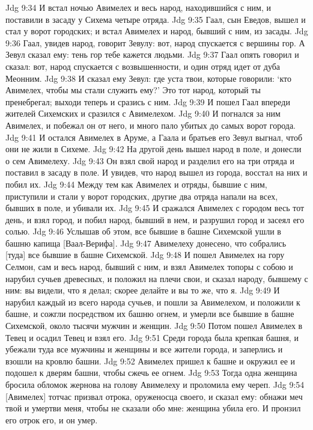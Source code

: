 Jdg 9:34  И встал ночью Авимелех и весь народ, находившийся с ним, и поставили в засаду у Сихема четыре отряда.
Jdg 9:35  Гаал, сын Еведов, вышел и стал у ворот городских; и встал Авимелех и народ, бывший с ним, из засады.
Jdg 9:36  Гаал, увидев народ, говорит Зевулу: вот, народ спускается с вершины гор. А Зевул сказал ему: тень гор тебе кажется людьми.
Jdg 9:37  Гаал опять говорил и сказал: вот, народ спускается с возвышенности, и один отряд идет от дуба Меонним.
Jdg 9:38  И сказал ему Зевул: где уста твои, которые говорили: `кто Авимелех, чтобы мы стали служить ему?' Это тот народ, который ты пренебрегал; выходи теперь и сразись с ним.
Jdg 9:39  И пошел Гаал впереди жителей Сихемских и сразился с Авимелехом.
Jdg 9:40  И погнался за ним Авимелех, и побежал он от него, и много пало убитых до самых ворот города.
Jdg 9:41  И остался Авимелех в Аруме, а Гаала и братьев его Зевул выгнал, чтоб они не жили в Сихеме.
Jdg 9:42  На другой день вышел народ в поле, и донесли о сем Авимелеху.
Jdg 9:43  Он взял свой народ и разделил его на три отряда и поставил в засаду в поле. И увидев, что народ вышел из города, восстал на них и побил их.
Jdg 9:44  Между тем как Авимелех и отряды, бывшие с ним, приступили и стали у ворот городских, другие два отряда напали на всех, бывших в поле, и убивали их.
Jdg 9:45  И сражался Авимелех с городом весь тот день, и взял город, и побил народ, бывший в нем, и разрушил город и засеял его солью.
Jdg 9:46  Услышав об этом, все бывшие в башне Сихемской ушли в башню капища [Ваал-Верифа].
Jdg 9:47  Авимелеху донесено, что собрались [туда] все бывшие в башне Сихемской.
Jdg 9:48  И пошел Авимелех на гору Селмон, сам и весь народ, бывший с ним, и взял Авимелех топоры с собою и нарубил сучьев древесных, и положил на плечи свои, и сказал народу, бывшему с ним: вы видели, что я делал; скорее делайте и вы то же, что я.
Jdg 9:49  И нарубил каждый из всего народа сучьев, и пошли за Авимелехом, и положили к башне, и сожгли посредством их башню огнем, и умерли все бывшие в башне Сихемской, около тысячи мужчин и женщин.
Jdg 9:50  Потом пошел Авимелех в Тевец и осадил Тевец и взял его.
Jdg 9:51  Среди города была крепкая башня, и убежали туда все мужчины и женщины и все жители города, и заперлись и взошли на кровлю башни.
Jdg 9:52  Авимелех пришел к башне и окружил ее и подошел к дверям башни, чтобы сжечь ее огнем.
Jdg 9:53  Тогда одна женщина бросила обломок жернова на голову Авимелеху и проломила ему череп.
Jdg 9:54  [Авимелех] тотчас призвал отрока, оруженосца своего, и сказал ему: обнажи меч твой и умертви меня, чтобы не сказали обо мне: женщина убила его. И пронзил его отрок его, и он умер.

